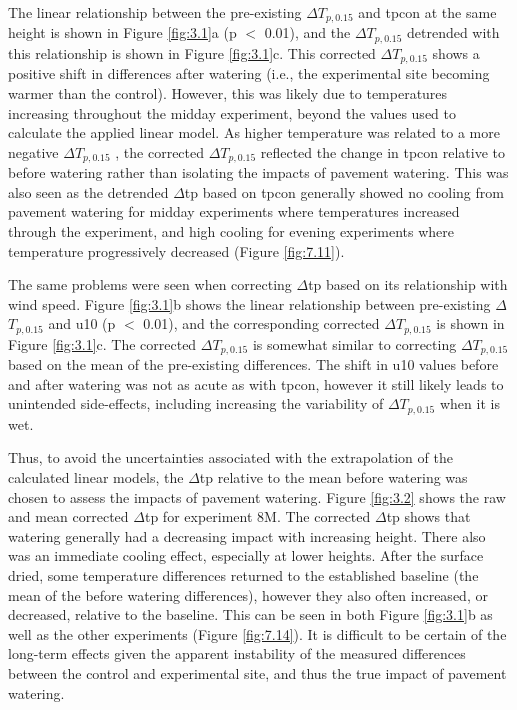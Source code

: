 \documentclass[final,3p,times,authoryear]{elsarticle}
\begin{document}
The linear relationship between the pre-existing $\Delta$$T_{p,0.15}$ and \gls{tpcon} at the same height is shown in Figure \ref{fig:3.1}a (p $<$ 0.01), and the $\Delta$$T_{p,0.15}$ detrended with this relationship is shown in Figure \ref{fig:3.1}c. This corrected $\Delta$$T_{p,0.15}$ shows a positive shift in differences after watering (i.e., the experimental site becoming warmer than the control). However, this was likely due to temperatures increasing throughout the midday experiment, beyond the values used to calculate the applied linear model. As higher temperature was related to a more negative $\Delta$$T_{p,0.15}$ , the corrected $\Delta$$T_{p,0.15}$ reflected the change in \gls{tpcon} relative to before watering rather than isolating the impacts of pavement watering. This was also seen as the detrended $\Delta$\gls{tp} based on \gls{tpcon} generally showed no cooling from pavement watering for midday experiments where temperatures increased through the experiment, and high cooling for evening experiments where temperature progressively decreased (Figure \ref{fig:7.11}).

The same problems were seen when correcting $\Delta$\gls{tp} based on its relationship with wind speed. Figure \ref{fig:3.1}b shows the linear relationship between pre-existing $\Delta$$T_{p,0.15}$ and \gls{u10} (\gls{p} $<$ 0.01), and the corresponding corrected $\Delta$$T_{p,0.15}$ is shown in Figure \ref{fig:3.1}c. The corrected $\Delta$$T_{p,0.15}$ is somewhat similar to correcting $\Delta$$T_{p,0.15}$ based on the mean of the pre-existing differences. The shift in \gls{u10} values before and after watering was not as acute as with \gls{tpcon}, however it still likely leads to unintended side-effects, including increasing the variability of $\Delta$$T_{p,0.15}$ when it is wet.

Thus, to avoid the uncertainties associated with the extrapolation of the calculated linear models, the $\Delta$\gls{tp} relative to the mean before watering was chosen to assess the impacts of pavement watering. Figure \ref{fig:3.2} shows the raw and mean corrected $\Delta$\gls{tp} for experiment 8M. The corrected $\Delta$\gls{tp} shows that watering generally had a decreasing impact with increasing height. There also was an immediate cooling effect, especially at lower heights. After the surface dried, some temperature differences returned to the established baseline (the mean of the before watering differences), however they also often increased, or decreased, relative to the baseline. This can be seen in both Figure \ref{fig:3.1}b as well as the other experiments (Figure \ref{fig:7.14}). It is difficult to be certain of the long-term effects given the apparent instability of the measured differences between the control and experimental site, and thus the true impact of pavement watering.
\end{document}
